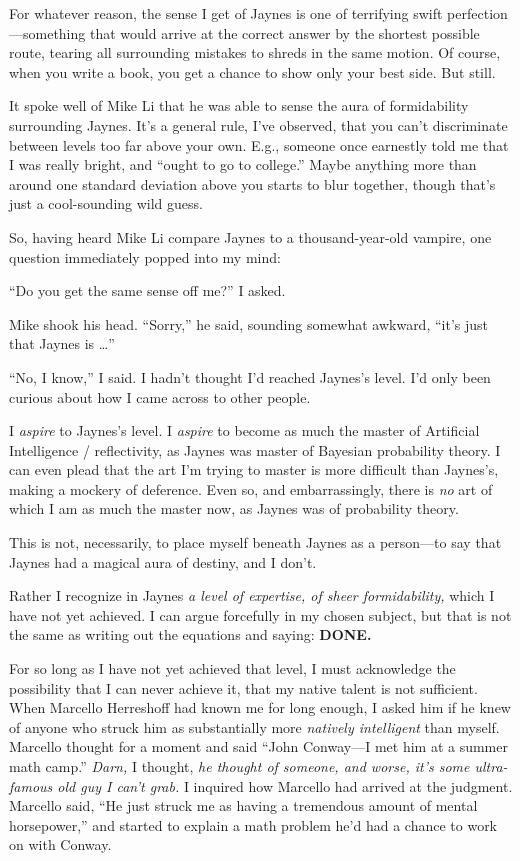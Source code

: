 {
 For whatever reason, the sense I get of Jaynes is one of
terrifying swift perfection---something that would arrive at the
correct answer by the shortest possible route, tearing all surrounding
mistakes to shreds in the same motion. Of course, when you write a
book, you get a chance to show only your best side. But still.}

{
 It spoke well of Mike Li that he was able to sense the aura of
formidability surrounding Jaynes. It's a general rule,
I've observed, that you can't
discriminate between levels too far above your own. E.g., someone once
earnestly told me that I was really bright, and
``ought to go to college.'' Maybe
anything more than around one standard deviation above you starts to
blur together, though that's just a cool-sounding wild
guess.}

{
 So, having heard Mike Li compare Jaynes to a thousand-year-old
vampire, one question immediately popped into my mind:}

{
 ``Do you get the same sense off
me?'' I asked.}

{
 Mike shook his head. ``Sorry,''
he said, sounding somewhat awkward,
``it's just that Jaynes is
\ldots''}

{
 ``No, I know,'' I said. I
hadn't thought I'd reached
Jaynes's level. I'd only been curious
about how I came across to other people.}

{
 I \textit{aspire} to Jaynes's level. I
\textit{aspire} to become as much the master of Artificial Intelligence
/ reflectivity, as Jaynes was master of Bayesian probability theory. I
can even plead that the art I'm trying to master is
more difficult than Jaynes's, making a mockery of
deference. Even so, and embarrassingly, there is \textit{no} art of
which I am as much the master now, as Jaynes was of probability
theory.}

{
 This is not, necessarily, to place myself beneath Jaynes as a
person---to say that Jaynes had a magical aura of destiny, and I
don't.}

{
 Rather I recognize in Jaynes \textit{a level of expertise, of
sheer formidability,} which I have not yet achieved. I can argue
forcefully in my chosen subject, but that is not the same as writing
out the equations and saying: \textbf{DONE.}}

{
 For so long as I have not yet achieved that level, I must
acknowledge the possibility that I can never achieve it, that my native
talent is not sufficient. When Marcello Herreshoff had known me for
long enough, I asked him if he knew of anyone who struck him as
substantially more \textit{natively intelligent} than myself. Marcello
thought for a moment and said ``John Conway---I met
him at a summer math camp.'' \textit{Darn,} I
thought, \textit{he thought of someone, and worse, it's
some ultra-famous old guy I can't grab.} I inquired how
Marcello had arrived at the judgment. Marcello said,
``He just struck me as having a tremendous amount of
mental horsepower,'' and started to explain a math
problem he'd had a chance to work on with Conway.}

